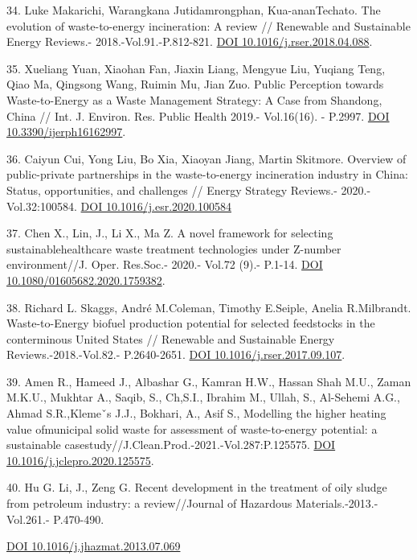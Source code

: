 34. Luke Makarichi, Warangkana Jutidamrongphan, Kua-ananTechato. The
evolution of waste-to-energy incineration: A review // Renewable and
Sustainable Energy Reviews.- 2018.-Vol.91.-P.812-821.
\href{https://doi.org/10.1016/j.rser.2018.04.088}{DOI
10.1016/j.rser.2018.04.088}.

35. Xueliang Yuan, Xiaohan Fan, Jiaxin Liang, Mengyue Liu, Yuqiang Teng,
Qiao Ma, Qingsong Wang, Ruimin Mu, Jian Zuo. Public Perception towards
Waste-to-Energy as a Waste Management Strategy: A Case from Shandong,
China // Int. J. Environ. Res. Public Health 2019.- Vol.16(16). -
P.2997. \href{https://doi.org/10.3390/ijerph16162997}{DOI
10.3390/ijerph16162997}.

36. Caiyun Cui, Yong Liu, Bo Xia, Xiaoyan Jiang, Martin Skitmore.
Overview of public-private partnerships in the waste-to-energy
incineration industry in China: Status, opportunities, and challenges //
Energy Strategy Reviews.- 2020.- Vol.32:100584.
\href{https://doi.org/\%20DOI\%2010.1016/j.esr.2020.100584}{DOI
10.1016/j.esr.2020.100584}

37. Chen X., Lin, J., Li X., Ma Z. A novel framework for selecting
sustainablehealthcare waste treatment technologies under Z-number
environment//J. Oper. Res.Soc.- 2020.- Vol.72 (9).- P.1-14.
\href{https://doi.org/10.1080/01605682.2020.1759382}{DOI
10.1080/01605682.2020.1759382}.

38. Richard L. Skaggs, André M.Coleman, Timothy E.Seiple, Anelia
R.Milbrandt. Waste-to-Energy biofuel production potential for selected
feedstocks in the conterminous United States // Renewable and
Sustainable Energy Reviews.-2018.-Vol.82.- P.2640-2651.
\href{https://doi.org/10.1016/j.rser.2017.09.107}{DOI
10.1016/j.rser.2017.09.107}.

39. Amen R., Hameed J., Albashar G., Kamran H.W., Hassan Shah M.U.,
Zaman M.K.U., Mukhtar A., Saqib, S., Ch,S.I., Ibrahim M., Ullah, S.,
Al-Sehemi A.G., Ahmad S.R.,Klemeˇs J.J., Bokhari, A., Asif S., Modelling
the higher heating value ofmunicipal solid waste for assessment of
waste-to-energy potential: a sustainable
casestudy//J.Clean.Prod.-2021.-Vol.287:P.125575.
\href{https://doi.org/10.1016/j.jclepro.2020.125575}{DOI
10.1016/j.jclepro.2020.125575}.

40. Hu G. Li, J., Zeng G. Recent development in the treatment of oily
sludge from petroleum industry: a review//Journal of Hazardous
Materials.-2013.- Vol.261.- P.470-490.

\href{https://doi.org/10.1016/j.jhazmat.2013.07.069}{DOI
10.1016/j.jhazmat.2013.07.069}

